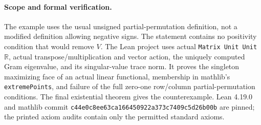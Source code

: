 \documentclass[11pt]{article}
\begin{document}
\paragraph{Scope and formal verification.}
The example uses the usual unsigned partial-permutation definition,
not a modified definition allowing negative signs. The statement
contains no positivity condition that would remove $V$.
The Lean project uses actual \texttt{Matrix Unit Unit}\,$\mathbb R$,
actual transpose/multiplication and vector action, the uniquely
computed Gram eigenvalue, and its singular-value trace norm.
It proves the singleton maximizing face of an actual linear functional,
membership in mathlib's \texttt{extremePoints}, and failure of the
full zero-one row/column partial-permutation conditions.
The final existential theorem gives the counterexample.
Lean 4.19.0 and mathlib commit
\texttt{c44e0c8ee63ca166450922a373c7409c5d26b00b} are pinned;
the printed axiom audits contain only the permitted standard axioms.
\end{document}
